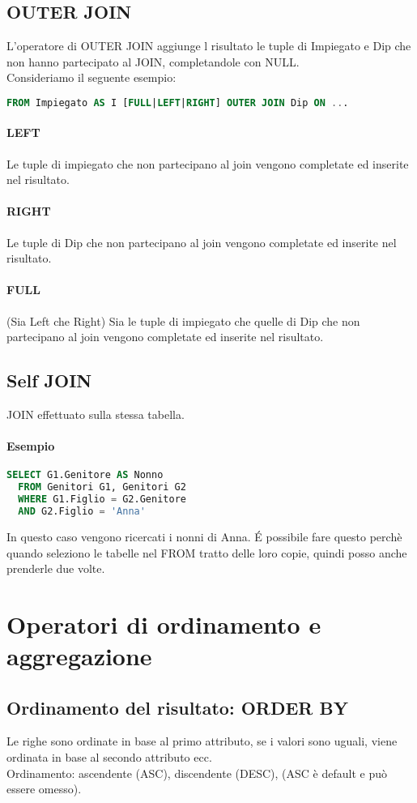 \subsection{OUTER JOIN}
L'operatore di OUTER JOIN aggiunge l risultato le tuple di Impiegato e Dip che non hanno partecipato al JOIN,
completandole con NULL.\\
Consideriamo il seguente esempio:
\begin{lstlisting}[language=SQL]
  FROM Impiegato AS I [FULL|LEFT|RIGHT] OUTER JOIN Dip ON ...
\end{lstlisting}
\paragraph*{LEFT} Le tuple di impiegato che non partecipano al join vengono completate ed inserite
nel risultato.
\paragraph*{RIGHT} Le tuple di Dip che non partecipano al join vengono completate ed inserite nel
risultato.
\paragraph*{FULL} (Sia Left che Right) Sia le tuple di impiegato che quelle di Dip che non partecipano al join
vengono completate ed inserite nel risultato.
\subsection{Self JOIN}
JOIN effettuato sulla stessa tabella.
\paragraph*{Esempio}
\begin{lstlisting}[language=SQL]
  SELECT G1.Genitore AS Nonno
  FROM Genitori G1, Genitori G2
  WHERE G1.Figlio = G2.Genitore
  AND G2.Figlio = 'Anna'
\end{lstlisting}
In questo caso vengono ricercati i nonni di Anna. \'E possibile fare questo perchè
quando seleziono le tabelle nel FROM tratto delle loro copie, quindi posso anche prenderle due volte.
\section{Operatori di ordinamento e aggregazione}
\subsection{Ordinamento del risultato: ORDER BY}
Le righe sono ordinate in base al primo attributo, se i valori sono uguali,
viene ordinata in base al secondo attributo ecc.\\
Ordinamento: ascendente (ASC), discendente (DESC), (ASC è default e può
essere omesso).
